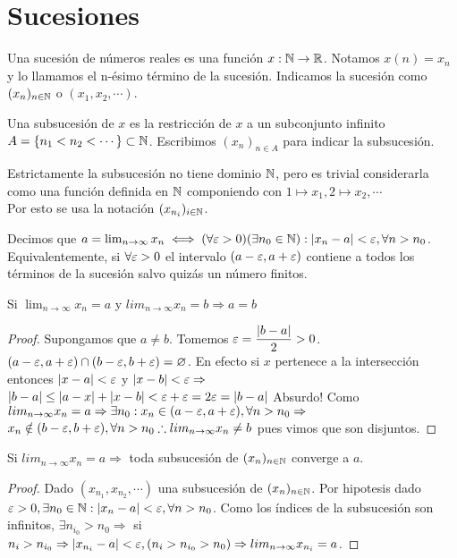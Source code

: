 \section{Sucesiones}

Una sucesión de números reales es una función $x: \mathbb{N} \to \mathbb{R}$. Notamos $x(n) = x_n$ y lo llamamos el n-ésimo término de la sucesión. Indicamos la sucesión como $(x_n)_{n \in \mathbb{N}}$ o $(x_1, x_2, \cdots)$.

Una subsucesión de $x$ es la restricción de $x$ a un subconjunto infinito $A = \{ n_1 < n_2 < \cdots \} \subset \mathbb{N}$. Escribimos $(x_n)_{n \in A}$ para indicar la subsucesión.

\begin{note}
  Estrictamente la subsucesión no tiene dominio $\mathbb{N}$, pero es trivial considerarla como una función definida en $\mathbb{N}$ componiendo con $1 \mapsto x_1, 2 \mapsto x_2, \cdots$ \\
  Por esto se usa la notación $(x_{n_i})_{i \in \mathbb{N}}$.
\end{note}

\begin{definition}
  Decimos que $a = \lim_{n \to \infty} x_n \iff (\forall \varepsilon > 0)(\exists n_0 \in \mathbb{N}) : |x_n - a| < \varepsilon, \forall n > n_0$. \\
  Equivalentemente, si $\forall \varepsilon > 0$ el intervalo $(a-\varepsilon, a+\varepsilon)$ contiene a todos los términos de la sucesión salvo quizás un número finitos.
\end{definition}

\begin{theorem}
  Si $\lim_{n \to \infty} x_n = a$ y $lim_{n \to \infty} x_n = b \Rightarrow a=b$
  \begin{proof}
    Supongamos que $a \neq b$. Tomemos $\varepsilon = \dfrac{|b-a|}{2} > 0$. \\
    $(a - \varepsilon, a+\varepsilon) \cap (b-\varepsilon, b+\varepsilon) = \varnothing$. En efecto si
    $x$ pertenece a la intersección entonces $|x-a| < \varepsilon$ y $|x-b| < \varepsilon \Rightarrow$ \\
    $|b-a| \leq |a-x| + |x-b| < \varepsilon + \varepsilon = 2 \varepsilon = |b-a|$ Absurdo!
    Como $lim_{n \to \infty} x_n = a \Rightarrow \exists n_0 : x_n \in (a - \varepsilon, a+ \varepsilon), \forall n > n_0 \Rightarrow$ \\
    $x_n \notin (b-\varepsilon, b+\varepsilon), \forall n > n_0 \therefore lim_{n \to \infty} x_n \neq b$ pues vimos que son disjuntos.
  \end{proof}
\end{theorem}

\begin{theorem}
  Si $lim_{n \to \infty} x_n = a \Rightarrow$ toda subsucesión de $(x_n)_{n \in \mathbb{N}}$ converge a $a$.

  \begin{proof}
    Dado $(x_{n_1}, x_{n_2}, \cdots)$ una subsucesión de $(x_n)_{n \in \mathbb{N}}$. Por hipotesis dado $\varepsilon > 0, \exists n_0 \in \mathbb{N} : |x_n - a| < \varepsilon, \forall n > n_0$. Como los índices de la subsucesión son infinitos, $\exists n_{i_0} > n_0 \Rightarrow$ si $n_i > n_{i_0} \Rightarrow |x_{n_i} - a| < \varepsilon, (n_i > n_{i_0} > n_0) \Rightarrow lim_{n \to \infty} x_{n_i} = a$.
  \end{proof}
\end{theorem}

